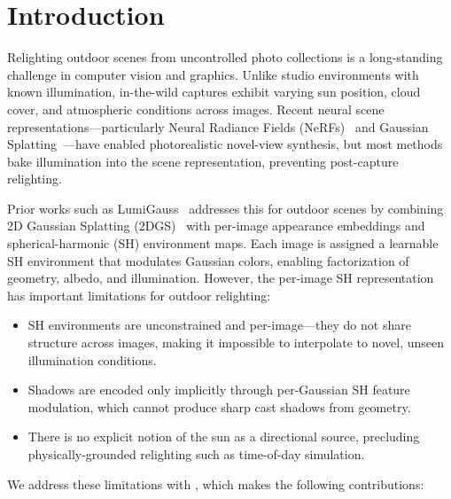 \section{Introduction}
\label{sec:intro}

Relighting outdoor scenes from uncontrolled photo collections is a long-standing challenge in computer vision and graphics.
Unlike studio environments with known illumination, in-the-wild captures exhibit varying sun position, cloud cover, and atmospheric conditions across images.
Recent neural scene representations---particularly Neural Radiance Fields (NeRFs)~\cite{mildenhall2020nerf} and Gaussian Splatting~\cite{kerbl20233dgs}---have enabled photorealistic novel-view synthesis, but most methods bake illumination into the scene representation, preventing post-capture relighting.

Prior works such as LumiGauss~\cite{joaxkal2024lumigauss} addresses this for outdoor scenes by combining 2D Gaussian Splatting (2DGS)~\cite{huang20242dgs} with per-image appearance embeddings and spherical-harmonic (SH) environment maps.
Each image is assigned a learnable SH environment that modulates Gaussian colors, enabling factorization of geometry, albedo, and illumination.
However, the per-image SH representation has important limitations for outdoor relighting:
\begin{itemize}
    \item SH environments are unconstrained and per-image---they do not share structure across images, making it impossible to interpolate to novel, unseen illumination conditions.
    \item Shadows are encoded only implicitly through per-Gaussian SH feature modulation, which cannot produce sharp cast shadows from geometry.
    \item There is no explicit notion of the sun as a directional source, precluding physically-grounded relighting such as time-of-day simulation.
\end{itemize}

We address these limitations with \ours{}, which makes the following contributions:

